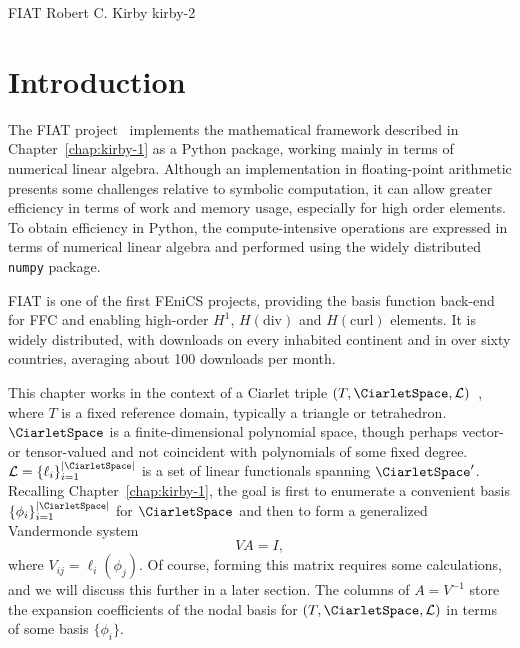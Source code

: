               {FIAT}
              {Robert C. Kirby}
              {kirby-2}

\section{Introduction}

The FIAT project~\citep{Kirby2004,Kirby2006} implements the mathematical
framework described in Chapter~\ref{chap:kirby-1} as a Python package,
working mainly in terms of numerical linear algebra.  Although an
implementation in floating-point arithmetic presents some challenges
relative to symbolic computation, it can allow greater efficiency in
terms of work and memory usage, especially for high order elements.
To obtain efficiency in Python, the compute-intensive operations are
expressed in terms of numerical linear algebra and performed using the
widely distributed \texttt{numpy} package.

FIAT is one of the first FEniCS projects, providing the basis function
back-end for FFC and enabling high-order \( H^1 \), \(
H(\mathrm{div}) \) and \( H(\mathrm{curl}) \) elements. It is widely
distributed, with downloads on every inhabited continent and in over
sixty countries, averaging about 100 downloads per month.

This chapter works in the context of a Ciarlet triple \( (T,\CiarletSpace,\mathcal{L})
\)~\citep{Ciarlet2002}, where \( T \) is a fixed reference domain,
typically a triangle or tetrahedron.  \( \CiarletSpace \) is a finite-dimensional
polynomial space, though perhaps vector- or tensor-valued and not
coincident with polynomials of some fixed degree.  \( \mathcal{L} =
\{ \ell_i \}_{i=1}^{|\CiarletSpace|} \) is a set of linear functionals spanning \(
\CiarletSpace^\prime \).  Recalling Chapter~\ref{chap:kirby-1}, the goal is first
to enumerate a convenient basis \( \{ \phi_i \}_{i=1}^{|\CiarletSpace|} \) for \(
\CiarletSpace \) and then to form a generalized Vandermonde system
\begin{equation}
  V A = I,
\end{equation}
where $V_{ij} = \ell_i( \phi_j)$.  Of course, forming this matrix
requires some calculations, and we will discuss this further in a later
section.  The columns of $A = V^{-1}$ store the expansion coefficients
of the nodal basis for \( (T,\CiarletSpace,\mathcal{L}) \) in terms of some basis
$\{ \phi_i \}$.

